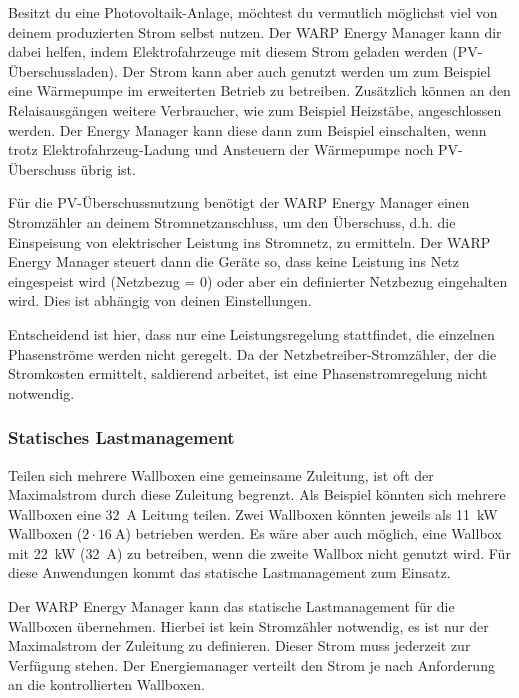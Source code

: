 \documentclass[a4paper,10pt]{article}
\begin{document}
\begin{multicols*}{2}
	Besitzt du eine Photovoltaik-Anlage, möchtest du vermutlich möglichst viel
	von deinem produzierten Strom selbst nutzen. Der WARP Energy Manager kann
	dir dabei helfen, indem Elektrofahrzeuge mit diesem Strom geladen werden (PV-Überschussladen).
    Der Strom kann aber auch genutzt werden um zum Beispiel eine Wärmepumpe im erweiterten Betrieb
    zu betreiben. Zusätzlich können an den Relaisausgängen weitere Verbraucher, wie zum Beispiel Heizstäbe,
    angeschlossen werden. Der Energy Manager kann diese dann zum Beispiel einschalten, wenn trotz
    Elektrofahrzeug-Ladung und Ansteuern der Wärmepumpe noch PV-Überschuss übrig ist.

	Für die PV-Überschussnutzung benötigt der WARP Energy Manager einen Stromzähler
	an deinem Stromnetzanschluss, um den Überschuss, d.h. die Einspeisung von
	elektrischer Leistung ins Stromnetz, zu ermitteln. Der WARP Energy Manager
	steuert dann die Geräte so, dass keine Leistung ins Netz eingespeist wird
	(Netzbezug = 0) oder aber ein definierter Netzbezug eingehalten wird. Dies
	ist abhängig von deinen Einstellungen.

	Entscheidend ist hier, dass nur eine Leistungsregelung stattfindet,
    die einzelnen Phasenströme werden nicht geregelt. Da der Netzbetreiber-Stromzähler,
	der die Stromkosten ermittelt, saldierend arbeitet, ist eine Phasenstromregelung nicht notwendig.

	\subsubsection{Statisches Lastmanagement}
	\label{statisches_lastmanagement}

	Teilen sich mehrere Wallboxen eine gemeinsame Zuleitung, ist oft der
	Maximalstrom durch diese Zuleitung begrenzt. Als Beispiel könnten sich mehrere
	Wallboxen eine \SI{32}{\ampere} Leitung teilen. Zwei Wallboxen könnten jeweils als \SI{11}{\kilo\watt}
	Wallboxen ($2\cdot\SI{16}{\ampere}$) betrieben werden. Es wäre aber auch möglich, eine
	Wallbox mit \SI{22}{\kilo\watt} (\SI{32}{\ampere}) zu betreiben, wenn die zweite Wallbox nicht genutzt
	wird. Für diese Anwendungen kommt das statische Lastmanagement zum Einsatz.

	Der WARP Energy Manager kann das statische Lastmanagement für die Wallboxen
	übernehmen. Hierbei ist kein Stromzähler notwendig, es ist nur der
	Maximalstrom der Zuleitung zu definieren. Dieser Strom muss jederzeit zur
	Verfügung stehen. Der Energiemanager verteilt den Strom
	je nach Anforderung an die kontrollierten Wallboxen.


\end{multicols*}
\end{document}
